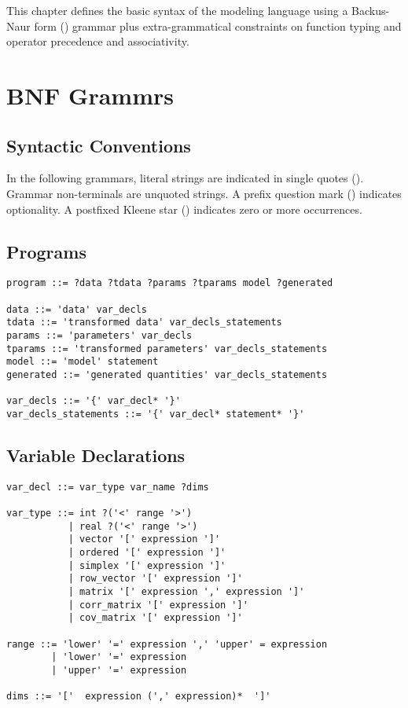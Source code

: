 \noindent
This chapter defines the basic syntax of the \Stan modeling language
using a Backus-Naur form (\BNF) grammar plus extra-grammatical
constraints on function typing and operator precedence and
associativity.


\section{BNF Grammrs}

\subsection{Syntactic Conventions}

In the following \BNF grammars, literal strings are indicated in
single quotes ().  Grammar non-terminals are unquoted strings.
A prefix question mark ()  indicates optionality.  A postfixed
Kleene star (\code{*}) indicates zero or more occurrences.

\subsection{Programs}

{\small
\begin{Verbatim}
program ::= ?data ?tdata ?params ?tparams model ?generated

data ::= 'data' var_decls
tdata ::= 'transformed data' var_decls_statements
params ::= 'parameters' var_decls
tparams ::= 'transformed parameters' var_decls_statements
model ::= 'model' statement
generated ::= 'generated quantities' var_decls_statements

var_decls ::= '{' var_decl* '}'
var_decls_statements ::= '{' var_decl* statement* '}'
\end{Verbatim}
}

\subsection{Variable Declarations}

{
\small
\begin{Verbatim}
var_decl ::= var_type var_name ?dims

var_type ::= int ?('<' range '>')
           | real ?('<' range '>')
           | vector '[' expression ']'
           | ordered '[' expression ']'
           | simplex '[' expression ']'
           | row_vector '[' expression ']'
           | matrix '[' expression ',' expression ']'
           | corr_matrix '[' expression ']'
           | cov_matrix '[' expression ']'

range ::= 'lower' '=' expression ',' 'upper' = expression
        | 'lower' '=' expression
        | 'upper' '=' expression

dims ::= '['  expression (',' expression)*  ']'
\end{Verbatim}
}

